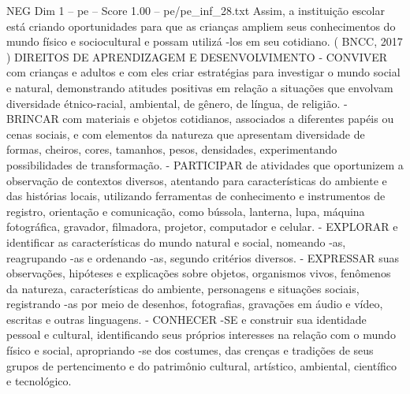\begin{textsample}{NEG Dim 1 – pe – Score 1.00 – pe/pe\_inf\_28.txt}
Assim, a instituição escolar está criando oportunidades para que as crianças ampliem seus conhecimentos do mundo físico e sociocultural e possam utilizá -los em seu cotidiano. ( BNCC, 2017 ) DIREITOS DE APRENDIZAGEM E DESENVOLVIMENTO - CONVIVER com crianças e adultos e com eles criar estratégias para investigar o mundo social e natural, demonstrando atitudes positivas em relação a situações que envolvam diversidade étnico-racial, ambiental, de gênero, de língua, de religião. - BRINCAR com materiais e objetos cotidianos, associados a diferentes papéis ou cenas sociais, e com elementos da natureza que apresentam diversidade de formas, cheiros, cores, tamanhos, pesos, densidades, experimentando possibilidades de transformação. - PARTICIPAR de atividades que oportunizem a observação de contextos diversos, atentando para características do ambiente e das histórias locais, utilizando ferramentas de conhecimento e instrumentos de registro, orientação e comunicação, como bússola, lanterna, lupa, máquina fotográfica, gravador, filmadora, projetor, computador e celular. - EXPLORAR e identificar as características do mundo natural e social, nomeando -as, reagrupando -as e ordenando -as, segundo critérios diversos. - EXPRESSAR suas observações, hipóteses e explicações sobre objetos, organismos vivos, fenômenos da natureza, características do ambiente, personagens e situações sociais, registrando -as por meio de desenhos, fotografias, gravações em áudio e vídeo, escritas e outras linguagens. - CONHECER -SE e construir sua identidade pessoal e cultural, identificando seus próprios interesses na relação com o mundo físico e social, apropriando -se dos costumes, das crenças e tradições de seus grupos de pertencimento e do patrimônio cultural, artístico, ambiental, científico e tecnológico.

\end{textsample}
